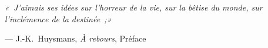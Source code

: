 {\itshape\setlength{\leftskip}{1em}\setlength{\rightskip}{1em}%
«~J'aimais ses idées sur l'horreur de la vie, sur la bêtise du monde,
sur l'inclémence de la destinée~;\thinspace»\par}%
\vspace{3pt}%
{\normalfont\hfill — J.-K.~Huysmans, \textit{À rebours}, Préface\par}%
